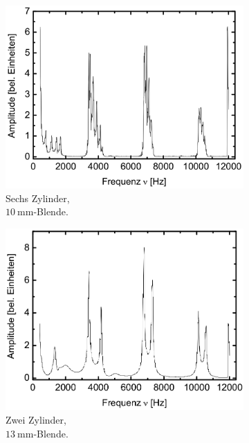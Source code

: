 \begin{figure}
\begin{subfigure}{0.3\textwidth}
  \end{subfigure}
  \begin{subfigure}{0.3\textwidth}
    \centering
    \includegraphics[width=\textwidth]{korrektur/6_50mm_10.png}
    \caption{Sechs Zylinder,\\$\SI{10}{\milli\meter}$-Blende.}
  \end{subfigure}
  \begin{subfigure}{0.3\textwidth}
    \centering
    \includegraphics[width=\textwidth]{korrektur/2_50mm_13.png}
    \caption{Zwei Zylinder,\\$\SI{13}{\milli\meter}$-Blende.}
  \end{subfigure}
  \begin{subfigure}{0.3\textwidth}

\end{subfigure}
\end{figure}
